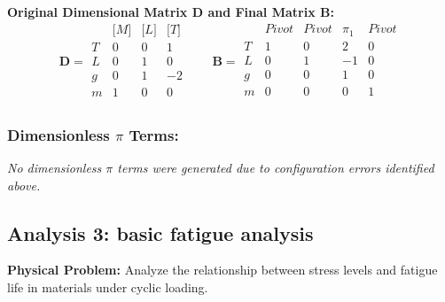 \textbf{Original Dimensional Matrix $\mathbf{D}$ and Final Matrix $\mathbf{B}$:}
\begin{equation}\mathbf{D} = \begin{array}{r|rrr}
& \text{[}M\text{]} & \text{[}L\text{]} & \text{[}T\text{]} \\
\hline
T & 0 & 0 & 1 \\
L & 0 & 1 & 0 \\
g & 0 & 1 & -2 \\
m & 1 & 0 & 0 \\
\end{array}
\qquad
\mathbf{B} = \begin{array}{r|rrrr}
& Pivot & Pivot & \pi_{1} & Pivot \\
\hline
T & 1 & 0 & 2 & 0 \\
L & 0 & 1 & -1 & 0 \\
g & 0 & 0 & 1 & 0 \\
m & 0 & 0 & 0 & 1 \\
\end{array}\end{equation}

\subsubsection*{Dimensionless $\pi$ Terms: }
\textit{No dimensionless $\pi$ terms were generated due to configuration errors identified above.}

\subsection{Analysis 3: basic fatigue analysis}
\label{sec:Basic_Fatigue_Analysis}

\begin{problembox}
\textbf{Physical Problem:} Analyze the relationship between stress levels and fatigue life in materials under cyclic loading.
\end{problembox}

